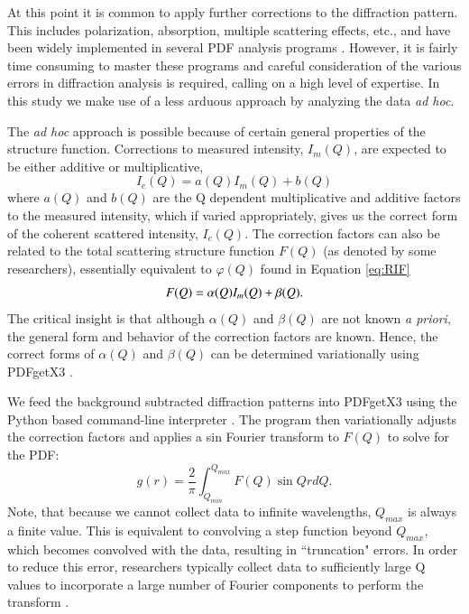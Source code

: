 At this point it is common to apply further corrections to the diffraction pattern. This includes polarization, absorption, multiple scattering effects, etc., and have been widely implemented in several PDF analysis programs \cite{Qiu2004}. However, it is fairly time consuming to master these programs and careful consideration of the various errors in diffraction analysis is required, calling on a high level of expertise. In this study we make use of a less arduous approach by analyzing the data \emph{ad hoc}. 

The \emph{ad hoc} approach is possible because of certain general properties of the structure function. Corrections to measured intensity, $I_{m}(Q)$, are expected to be  either additive or multiplicative,
\begin{equation}
I_{c}(Q) = a(Q)I_{m}(Q) + b(Q)
\label{eq:Im}
\end{equation}
where $a(Q)$ and $b(Q)$ are the Q dependent multiplicative and additive factors to the measured intensity, which if varied appropriately, gives us the correct form of the coherent scattered intensity, $I_{c}(Q)$. The correction factors can also be related to the total scattering structure function $F(Q)$ (as denoted by some researchers), essentially equivalent to $\varphi(Q)$ found in Equation \ref{eq:RIF}
\begin{equation}
F(Q) = \alpha(Q)I_{m}(Q) + \beta(Q).
\label{eq:F{Q}}
\end{equation}
The critical insight is that although $\alpha(Q)$ and $\beta(Q)$ are not known \emph{a priori}, the general form and behavior of the correction factors are known. Hence, the correct forms of $\alpha(Q)$ and $\beta(Q)$ can be determined variationally using PDFgetX3 \cite{Juhas2013a}.

We feed the background subtracted diffraction patterns into PDFgetX3 using the Python based command-line interpreter \cite{Juhas2013a}. The program then variationally adjusts the correction factors and applies a sin Fourier transform to $F(Q)$ to solve for the PDF:
\begin{equation}\label{eq:pdf}
g(r) = \frac{2}{\pi} \int_{Q_{min}}^{Q_{max}} F(Q) \sin{Qr} dQ.
\end{equation}
Note, that because we cannot collect data to infinite wavelengths, $Q_{max}$ is always a finite value. This is equivalent to convolving a step function beyond $Q_{max}$, which becomes convolved with the data, resulting in ``truncation" errors. In order to reduce this error, researchers typically collect data to sufficiently large Q values to incorporate a large number of Fourier components to perform the transform \cite{Dykhne2011}.

